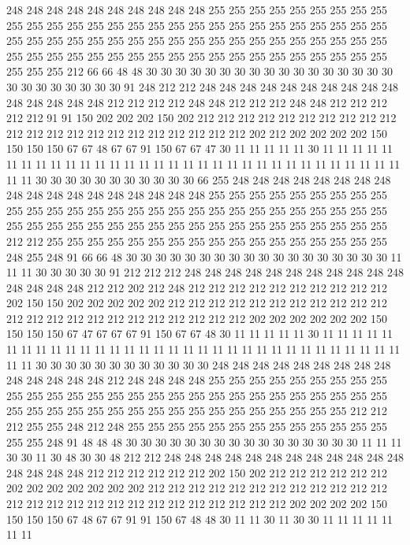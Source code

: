 248 248 248 248 248 248 248 248 248 248 255 255 255 255 255 255 255 255 255 255
255 255 255 255 255 255 255 255 255 255 255 255 255 255 255 255 255 255 255 255
255 255 255 255 255 255 255 255 255 255 255 255 255 255 255 255 255 255 255 255
255 255 255 255 255 255 255 255 255 255 255 255 255 255 255 255 255 255 255 212
66 66 48 48 30 30 30 30 30 30 30 30 30 30 30 30 30 30 30 30
30 30 30 30 30 30 30 30 30 91 248 212 212 248 248 248 248 248 248 248
248 248 248 248 248 248 248 248 212 212 212 212 248 248 212 212 212 248 248 212
212 212 212 212 91 91 150 202 202 202 150 202 212 212 212 212 212 212 212 212
212 212 212 212 212 212 212 212 212 212 212 212 212 212 202 212 202 202 202 202
150 150 150 150 67 67 48 67 67 91 150 67 67 47 30 11 11 11 11 11
30 11 11 11 11 11 11 11 11 11 11 11 11 11 11 11 11 11 11 11
11 11 11 11 11 11 11 11 11 11 11 11 11 11 11 30 30 30 30 30
30 30 30 30 30 30 66 255 248 248 248 248 248 248 248 248 248 248 248 248
248 248 248 248 248 248 255 255 255 255 255 255 255 255 255 255 255 255 255 255
255 255 255 255 255 255 255 255 255 255 255 255 255 255 255 255 255 255 255 255
255 255 255 255 255 255 255 255 255 255 255 255 255 212 212 255 255 255 255 255
255 255 255 255 255 255 255 255 255 255 255 255 248 255 248 91 66 66 48 30
30 30 30 30 30 30 30 30 30 30 30 30 30 30 30 30 30 11 11 11
30 30 30 30 30 91 212 212 212 248 248 248 248 248 248 248 248 248 248 248
248 248 248 248 212 212 202 212 248 212 212 212 212 212 212 212 212 212 212 202
150 150 202 202 202 202 202 212 212 212 212 212 212 212 212 212 212 212 212 212
212 212 212 212 212 212 212 212 212 212 202 202 202 202 202 202 150 150 150 150
67 47 67 67 67 91 150 67 67 48 30 11 11 11 11 11 30 11 11 11
11 11 11 11 11 11 11 11 11 11 11 11 11 11 11 11 11 11 11 11
11 11 11 11 11 11 11 11 11 11 11 30 30 30 30 30 30 30 30 30
30 30 30 248 248 248 248 248 248 248 248 248 248 248 248 248 248 212 248 248
248 248 255 255 255 255 255 255 255 255 255 255 255 255 255 255 255 255 255 255
255 255 255 255 255 255 255 255 255 255 255 255 255 255 255 255 255 255 255 255
255 255 255 255 255 255 255 212 212 212 255 255 248 212 248 255 255 255 255 255
255 255 255 255 255 255 255 255 255 255 248 91 48 48 48 30 30 30 30 30
30 30 30 30 30 30 30 30 30 30 30 11 11 11 30 30 11 30 48 30
30 48 212 212 248 248 248 248 248 248 248 248 248 248 248 248 248 248 248 248
212 212 212 212 212 212 202 150 202 212 212 212 212 212 212 202 202 202 202 202
202 202 212 212 212 212 212 212 212 212 212 212 212 212 212 212 212 212 212 212
212 212 212 212 212 212 212 212 202 202 202 202 150 150 150 150 67 48 67 67
91 91 150 67 48 48 30 11 11 30 11 30 30 11 11 11 11 11 11 11

